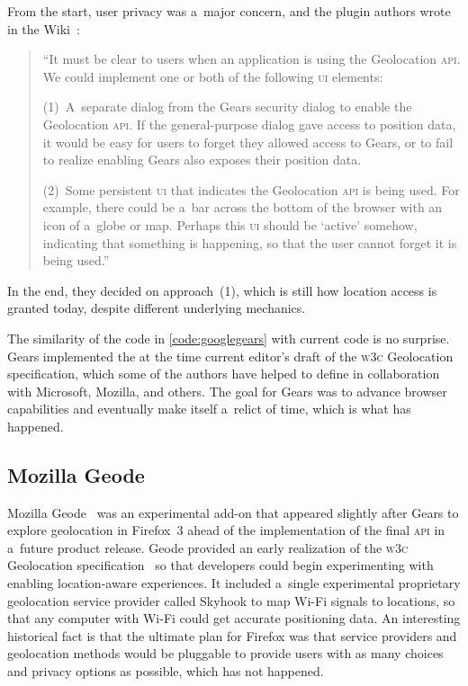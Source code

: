 \documentclass[sigconf,hyphens]{acmart}
\begin{document}
From the start, user privacy was a~major concern, and
the plugin authors wrote in the Wiki~\cite{gears2008wiki}:

\begin{quote}
``It must be clear to users when an application is using the Geolocation \textsc{api}.
We could implement one or both of the following \textsc{ui} elements:

(1)~A~separate dialog from the Gears security dialog to enable the Geolocation \textsc{api}.
If the general-purpose dialog gave access to position data,
it would be easy for users to forget they allowed access to Gears,
or to fail to realize enabling Gears also exposes their position data.

(2)~Some persistent \textsc{ui} that indicates the Geolocation \textsc{api} is being used.
For example, there could be a~bar across the bottom of the browser with an icon of a~globe or map.
Perhaps this \textsc{ui} should be `active' somehow, indicating that something is happening,
so that the user cannot forget it is being used.''
\end{quote}

In the end, they decided on approach~(1), which is still how location access is granted today,
despite different underlying mechanics.

The similarity of the code in \autoref{code:googlegears} with current code is no surprise.
Gears implemented the at the time current editor's draft of the \textsc{w3c} Geolocation
specification, which some of the authors have helped to define in collaboration with Microsoft,
Mozilla, and others. The goal for Gears was to advance browser capabilities and eventually make
itself a~relict of time, which is what has happened.

\subsection{Mozilla Geode}

Mozilla Geode~\cite{beard2008geode} was an experimental add-on 
that appeared slightly after Gears to explore geolocation in Firefox~3
ahead of the implementation of the final \textsc{api} in a~future product release.
Geode provided an early realization of the \textsc{w3c} Geolocation
specification~\cite{popescu2016geolocation} so that developers could begin experimenting
with enabling location-aware experiences.
It included a~single experimental proprietary geolocation service provider called Skyhook to map
Wi-Fi signals to locations, so that any computer with Wi-Fi could get accurate positioning data.
An interesting historical fact is that the ultimate plan for Firefox was that service providers
and geolocation methods would be pluggable to provide users
with as many choices and privacy options as possible,
which has not happened.
\end{document}
